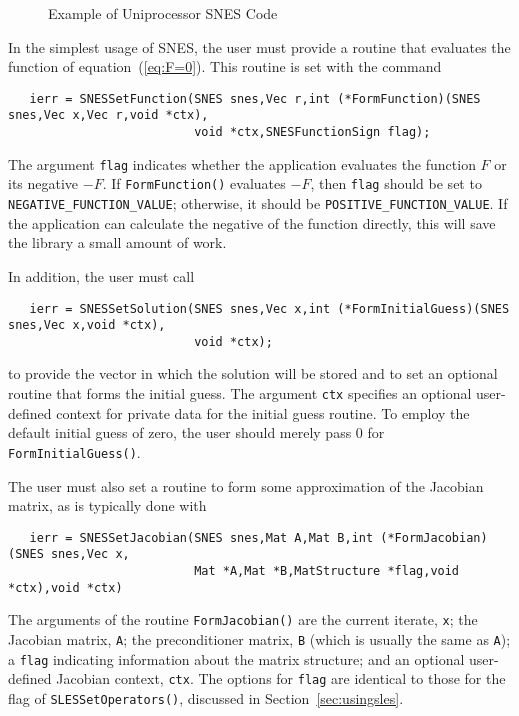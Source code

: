 \begin{figure}[H]
{\small
{}
}
\caption{Example of Uniprocessor SNES Code}
\label{fig:snesexample}
\end{figure}

In the simplest usage of SNES, the user must provide a routine that
evaluates the function of equation~(\ref{eq:F=0}).  This
routine is set with the command 
\begin{verbatim}
   ierr = SNESSetFunction(SNES snes,Vec r,int (*FormFunction)(SNES snes,Vec x,Vec r,void *ctx),
                          void *ctx,SNESFunctionSign flag);
\end{verbatim}
The argument {\tt flag} indicates whether the application evaluates the
function $F$ or its negative $-F$.  If 
{\tt FormFunction()} evaluates $-F$, then {\tt flag} should be set to 
{\tt NEGATIVE\_FUNCTION\_VALUE};
 otherwise, it should be {\tt POSITIVE\_FUNCTION\_VALUE}.
If the application can calculate the negative of the function directly, this 
will save the library a small amount of work. 
 

In addition, the user must call
\begin{verbatim}
   ierr = SNESSetSolution(SNES snes,Vec x,int (*FormInitialGuess)(SNES snes,Vec x,void *ctx),
                          void *ctx);
\end{verbatim}
to  provide the vector in which the solution
will be stored and to set an optional routine that forms the initial guess.
The argument {\tt ctx} specifies an optional user-defined context for 
private data for the initial guess routine.  To employ the default 
initial guess of zero, the user should 
merely pass 0 for {\tt FormInitialGuess()}.

The user must also set a routine to form
some approximation of the Jacobian matrix, as is 
typically done with
\begin{verbatim}
   ierr = SNESSetJacobian(SNES snes,Mat A,Mat B,int (*FormJacobian)(SNES snes,Vec x,
                          Mat *A,Mat *B,MatStructure *flag,void *ctx),void *ctx)
\end{verbatim}
The  arguments of the routine
{\tt FormJacobian()} are the current iterate, {\tt x}; the Jacobian 
matrix, {\tt A}; the preconditioner matrix, {\tt B} (which is usually
the same as {\tt A}); a {\tt flag} indicating information about the matrix
structure; and an optional user-defined Jacobian context, {\tt ctx}.
The options for {\tt flag} are identical to those for the flag of
{\tt SLESSetOperators()}, discussed in Section~\ref{sec:usingsles}.

